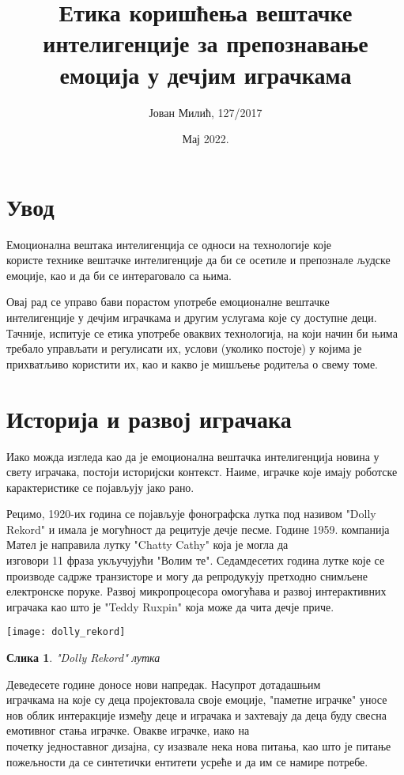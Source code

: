\documentclass{article}
\title{Етика коришћења вештачке интелигенције за препознавање емоција у дечјим играчкама}
\author{Јован Милић, 127/2017 }
\date{Мај 2022.}
\newtheorem{image}{Слика}
\begin{document}
\maketitle

\justifying

\pagebreak
\tableofcontents
\pagebreak


\section{Увод}


Емоционална вештака интелигенција се односи на технологије које \\користе технике вештачке интелигенције да би се осетиле и препознале људске емоције, као и да би се интераговало са њима. 

Овај рад се управо бави порастом употребе емоционалне вештачке \\интелигенције у дечјим играчкама и другим услугама које су доступне деци. Тачније, испитује се етика употребе оваквих технологија, на који начин би њима требало управљати и регулисати их, услови (уколико постоје) у којима је прихватљиво користити их, као и какво је мишљење родитеља о свему томе.  

\section{Историја и развој играчака}
Иако можда изгледа као да је емоционална вештачка интелигенција новина у свету играчака, постоји историјски контекст. Наиме, играчке које имају роботске карактеристике се појављују јако рано. 

Рецимо, 1920-их година се појављује фонографска лутка под називом "Dolly Rekord" и имала је могућност да рецитује дечје песме. Године 1959. компанија Мател је направила лутку "Chatty Cathy" која је могла да \\изговори 11 фраза укључујући "Волим те". Седамдесетих година лутке које се производе садрже транзисторе и могу да репродукују претходно снимљене електронске поруке. Развој микропроцесора омогућава и развој интерактивних играчака као што је "Teddy Ruxpin" која може да чита дечје приче. 

\texttt{[image: dolly\_rekord]}
\begin{image}
\centering
"Dolly Rekord" лутка
\end{image}

Деведесете године доносе нови напредак. Насупрот дотадашњим \\играчкама на које су деца пројектовала своје емоције, "паметне играчке" уносе нов облик интеракције између деце и играчака и захтевају да деца буду свесна емотивног стања играчке. Овакве играчке, иако на \\почетку једноставног дизајна, су изазвале нека нова питања, као што је питање пожељности да се синтетички ентитети усреће и да им се намире потребе. 
\end{document}
